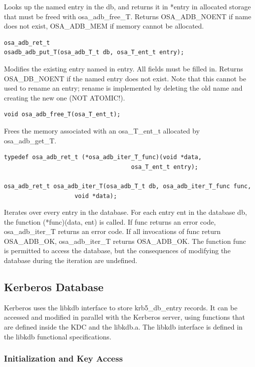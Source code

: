 Looks up the named entry in the db, and returns it in *entry in
allocated storage that must be freed with osa_adb_free_T.  Returns
OSA_ADB_NOENT if name does not exist, OSA_ADB_MEM if memory cannot be
allocated.

\begin{verbatim}
osa_adb_ret_t
osadb_adb_put_T(osa_adb_T_t db, osa_T_ent_t entry);
\end{verbatim}

Modifies the existing entry named in entry.  All fields must be filled
in.  Returns OSA_DB_NOENT if the named entry does not exist.  Note
that this cannot be used to rename an entry; rename is implemented by
deleting the old name and creating the new one (NOT ATOMIC!).

\begin{verbatim}
void osa_adb_free_T(osa_T_ent_t);
\end{verbatim}

Frees the memory associated with an osa_T_ent_t allocated by
osa_adb_get_T.

\begin{verbatim}
typedef osa_adb_ret_t (*osa_adb_iter_T_func)(void *data,
                                    osa_T_ent_t entry);

osa_adb_ret_t osa_adb_iter_T(osa_adb_T_t db, osa_adb_iter_T_func func,
                    void *data);
\end{verbatim}

Iterates over every entry in the database.  For each entry ent in the
database db, the function (*func)(data, ent) is called.  If func
returns an error code, osa_adb_iter_T returns an error code.  If all
invocations of func return OSA_ADB_OK, osa_adb_iter_T returns
OSA_ADB_OK.  The function func is permitted to access the database,
but the consequences of modifying the database during the iteration
are undefined.

\subsection{Kerberos Database}

Kerberos uses the libkdb interface to store krb5_db_entry records.  It
can be accessed and modified in parallel with the Kerberos server,
using functions that are defined inside the KDC and the libkdb.a.  The
libkdb interface is defined in the libkdb functional specifications.

\subsubsection{Initialization and Key Access}

